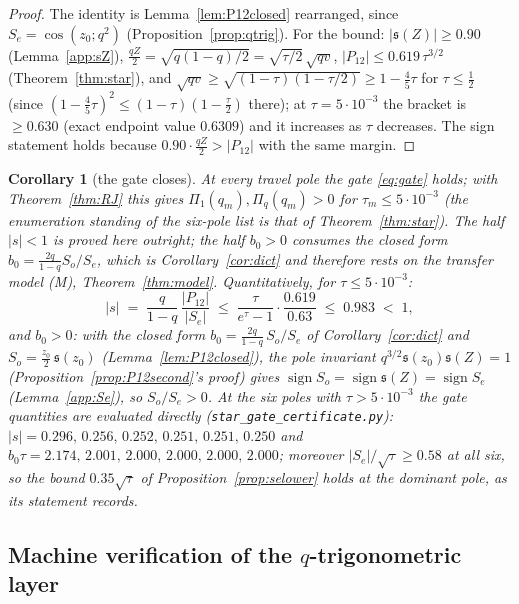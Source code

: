 \documentclass[11pt]{article}
\theoremstyle{plain}
\newtheorem{corollary}[theorem]{Corollary}
\theoremstyle{definition}
\theoremstyle{remark}
\begin{document}
\begin{proof}
The identity is Lemma~\ref{lem:P12closed} rearranged, since $S_e=\cos(z_0;q^2)$
(Proposition~\ref{prop:qtrig}). For the bound: $|\mathfrak s(Z)|\ge0.90$ (Lemma~\ref{app:sZ}),
$\tfrac{qZ}2=\sqrt{q(1-q)/2}=\sqrt{\tau/2}\,\sqrt{qv}$, $|P_{12}|\le0.619\,\tau^{3/2}$
(Theorem~\ref{thm:star}), and $\sqrt{qv}\ge\sqrt{(1-\tau)(1-\tau/2)}\ge1-\tfrac45\tau$ for
$\tau\le\tfrac12$ (since $(1-\tfrac45\tau)^2\le(1-\tau)(1-\tfrac\tau2)$ there); at
$\tau=5\cdot10^{-3}$ the bracket is $\ge0.630$ (exact endpoint value $0.6309$) and it increases as
$\tau$ decreases. The sign
statement holds because $0.90\cdot\tfrac{qZ}2>|P_{12}|$ with the same margin.
\end{proof}

\begin{corollary}[the gate closes]\label{app:gate}
At every travel pole the gate \eqref{eq:gate} holds; with Theorem~\ref{thm:RJ} this gives
$\Pi_1(q_m),\Pi_q(q_m)>0$ for $\tau_m\le5\cdot10^{-3}$ (the enumeration
standing of the six-pole list is that of Theorem~\ref{thm:star}). The half $|s|<1$ is proved here
outright; the half $b_0>0$ consumes the closed form $b_0=\tfrac{2q}{1-q}S_o/S_e$, which is
Corollary~\ref{cor:dict} and therefore rests on the transfer model \textup{(M)},
Theorem~\ref{thm:model}. Quantitatively,
for $\tau\le5\cdot10^{-3}$:
\[
 |s|\;=\;\frac{q}{1-q}\,\frac{|P_{12}|}{|S_e|}\;\le\;\frac{\tau}{e^\tau-1}\cdot\frac{0.619}{0.63}
 \;\le\;0.983\;<\;1,
\]
and $b_0>0$: with the closed form $b_0=\tfrac{2q}{1-q}\,S_o/S_e$ of Corollary~\ref{cor:dict} and
$S_o=\tfrac{z_0}2\,\mathfrak s(z_0)$ (Lemma~\ref{lem:P12closed}), the pole invariant
$q^{3/2}\mathfrak s(z_0)\mathfrak s(Z)=1$ (Proposition~\ref{prop:P12second}'s proof) gives
$\operatorname{sign}S_o=\operatorname{sign}\mathfrak s(Z)=\operatorname{sign}S_e$
(Lemma~\ref{app:Se}), so $S_o/S_e>0$. At the six poles with $\tau>5\cdot10^{-3}$ the gate
quantities are evaluated directly (\texttt{star\_gate\_certificate.py}):
$|s|=0.296,\,0.256,\,0.252,\,0.251,\,0.251,\,0.250$ and
$b_0\tau=2.174,\,2.001,\,2.000,\,2.000,\,2.000,\,2.000$; moreover $|S_e|/\sqrt\tau\ge0.58$ at
all six, so the bound $0.35\sqrt\tau$ of Proposition~\ref{prop:selower} holds at the dominant pole,
as its statement records.
\end{corollary}

\subsection*{Machine verification of the $q$-trigonometric layer}
\end{document}
